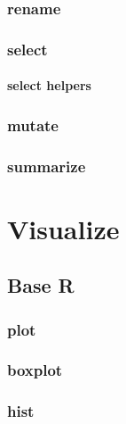 \documentclass[
  12pt,
]{book}
\begin{document}
\hypertarget{rename}{%
\section{rename}\label{rename}}

\hypertarget{select}{%
\section{select}\label{select}}

\hypertarget{select-helpers}{%
\subsection{select helpers}\label{select-helpers}}

\hypertarget{mutate}{%
\section{mutate}\label{mutate}}

\hypertarget{summarize}{%
\section{summarize}\label{summarize}}

\hypertarget{part-visualize}{%
\part{Visualize}\label{part-visualize}}

\hypertarget{base-r}{%
\chapter{Base R}\label{base-r}}

\hypertarget{plot}{%
\section{plot}\label{plot}}

\hypertarget{boxplot}{%
\section{boxplot}\label{boxplot}}

\hypertarget{hist}{%
\section{hist}\label{hist}}
\end{document}
